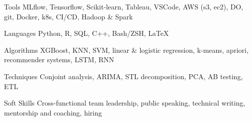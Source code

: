 

\begin{cvskills}

  \cvskill
    {Tools} %
    {MLflow, Tensorflow, Scikit-learn, Tableau, VSCode, AWS (s3, ec2), DO, git, Docker, k8s, CI/CD, Hadoop \& Spark} %

  \cvskill
    {Languages} %
    {Python, R, SQL, C++, Bash/ZSH, {\LaTeX{}}} %

  \cvskill
    {Algorithms} %
    {XGBoost, KNN, SVM, linear \& logistic regression, k-means, apriori, recommender systems, LSTM, RNN} %

  \cvskill
    {Techniques} %
    {Conjoint analysis, ARIMA, STL decomposition, PCA, AB testing, ETL} %

  \cvskill
    {Soft Skills} %
    {Cross-functional team leadership, public speaking, technical writing, mentorship and coaching, hiring} %

\end{cvskills}
